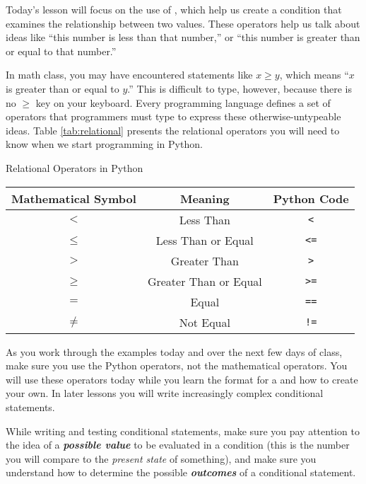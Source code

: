 Today's lesson will focus on the use of , which help us create a condition that examines the relationship between two values.  These operators help us talk about ideas like ``this number is less than that number,'' or ``this number is greater than or equal to that number.''

In math class, you may have encountered statements like $x \ge y$, which means ``$x$ is greater than or equal to $y$.''  This is difficult to type, however, because there is no $\ge$ key on your keyboard.  Every programming language defines a set of operators that programmers must type to express these otherwise-untypeable ideas.  Table \ref{tab:relational} presents the relational operators you will need to know when we start programming in Python.

\begin{mytable}[label=tab:relational]{Relational Operators in Python}
        \begin{tabulary}{\linewidth}{ccc}
            Mathematical Symbol & Meaning & Python Code\\
            \hline
            $<$ & Less Than & \texttt{<}\\
            $\le$ & Less Than or Equal & \texttt{<=}\\
            $>$ & Greater Than & \texttt{>}\\
            $\ge$ & Greater Than or Equal & \texttt{>=}\\
            $=$ & Equal & \texttt{==}\\
            $\neq$ & Not Equal & \texttt{!=}\\
            \hline
        \end{tabulary}
\end{mytable}

As you work through the examples today and over the next few days of class, make sure you use the Python operators, not the mathematical operators.  You will use these operators today while you learn the format for a  and how to create your own.  In later lessons you will write increasingly complex conditional statements.

While writing and testing conditional statements, make sure you pay attention to the idea of a \textbf{\textit{possible value}} to be evaluated in a condition (this is the number you will compare to the \textit{present state} of something), and make sure you understand how to determine the possible \textbf{\textit{outcomes}} of a conditional statement.